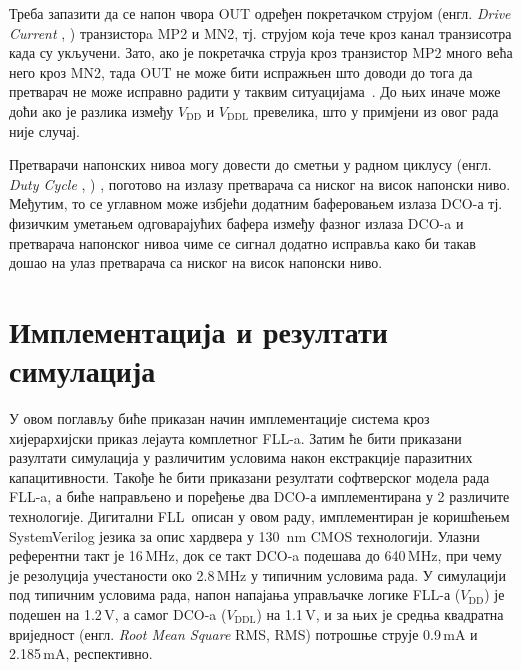 \documentclass[master]{finthesis}
\makeatletter
\newcommand*{\engl}[2][\@empty]{%
    \edef\theacronym{#1}%
    (енгл. \foreignlanguage{english}{\emph{#2}%
    \ifx\theacronym\@empty \else , #1\fi})%
}
\def \FLL  {FLL} %
\def \DCO  {DCO} %
\makeatother
\begin{document}
Треба запазити да се напон чвора OUT одређен покретачком струјом \engl{Drive Current} транзисторa MP2 и MN2, тј. струјом која тече кроз канал транзисотра када су укључени. Зато, ако је покретачка струја кроз транзистор MP2 много већа него кроз MN2, тада OUT не може бити испражњен што доводи до тога да претварач не може исправно радити у таквим ситуацијама~\cite{Osaki:6198744}. До њих иначе може доћи ако је разлика између $V_\text{DD}$ и $V_\text{DDL}$ превелика, што у примјени из овог рада није случај. \par
Претварачи напонских нивоа могу довести до сметњи у радном циклусу \engl{Duty Cycle}, поготово на излазу претварача са ниског на висок напонски ниво. Међутим, то се углавном може избјећи додатним баферовањем излаза \DCO-а тј. физичким уметањем одговарајућих бафера између фазног излаза \DCO-a и претварача напонског нивоа чиме се сигнал додатно исправља како би такав дошао на улаз претварача са ниског на висок напонски ниво.


\section{Имплементација и резултати симулација} \label{Implementation and results}
У овом поглављу биће приказан начин имплементације система кроз хијерархијски приказ лејаута комплетног \FLL-a. Затим ће бити приказани разултати симулација у различитим условима након екстракције паразитних капацитивности. Такође ће бити приказани резултати софтверског модела рада \FLL-a, а биће направљено и поређење два \DCO-а имплементирана у 2 различите технологије. Дигитални \FLL\ описан у овом раду, имплементиран је коришћењем SystemVerilog језика за опис хардвера у 130~nm CMOS технологији. Улазни референтни такт је 16\,MHz, док се такт \DCO-a подешава до 640\,MHz, при чему је резолуција учестаности око 2.8\,MHz у типичним условима рада. У симулацији под типичним условима рада, напон напајања управљачке логике \FLL-а ($V_\text{DD}$) је подешен на 1.2\,V, а самог \DCO-a ($V_\text{DDL}$) на 1.1\,V, и за њих је средња квадратна вриједност \engl[RMS]{Root Mean Square} потрошње струје 0.9\,mA и 2.185\,mA, респективно.
\end{document}
